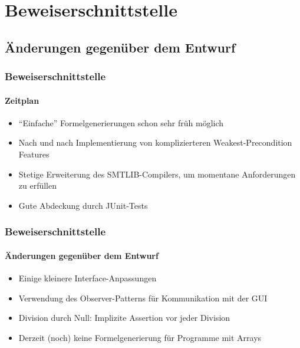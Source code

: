 \section{Beweiserschnittstelle}

\subsection{Änderungen gegenüber dem Entwurf}
\begin{frame}
\frametitle{Beweiserschnittstelle}
\framesubtitle{Zeitplan}
\begin{itemize}
	\item<+-> ``Einfache'' Formelgenerierungen schon sehr früh möglich
	\item<+-> Nach und nach Implementierung von komplizierteren Weakest-Precondition Features
	\item<+-> Stetige Erweiterung des SMTLIB-Compilers, um momentane Anforderungen zu erfüllen
	\item<+-> Gute Abdeckung durch JUnit-Tests
\end{itemize}
\end{frame}

\begin{frame}
\frametitle{Beweiserschnittstelle}
\framesubtitle{Änderungen gegenüber dem Entwurf}
\begin{itemize}
	\item<+-> Einige kleinere Interface-Anpassungen
	\item<+-> Verwendung des Observer-Patterns für Kommunikation mit der GUI
	\item<+-> Division durch Null: Implizite Assertion vor jeder Division
	\item<+-> Derzeit (noch) keine Formelgenerierung für Programme mit Arrays
\end{itemize}
\end{frame}

